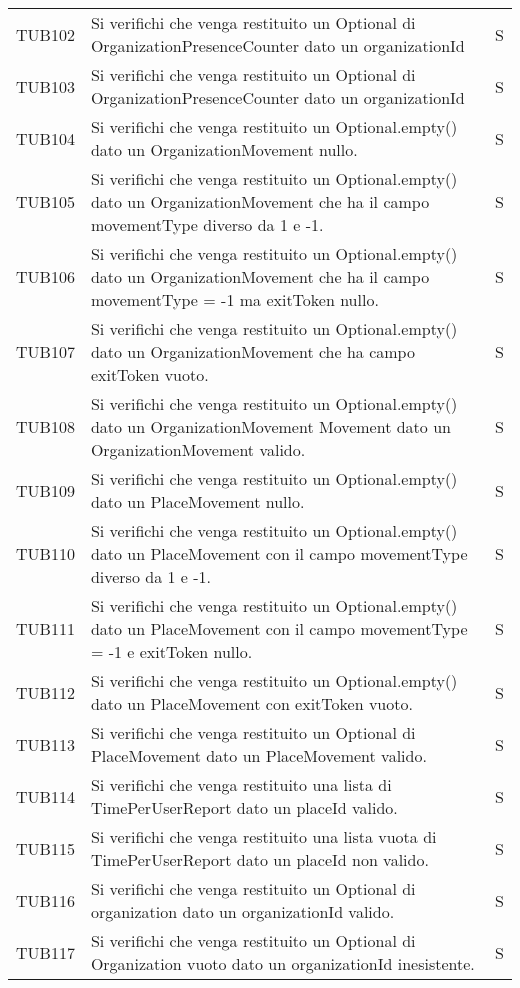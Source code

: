 {\begin{longtable}{ c C{13cm} C{1cm}}
TUB102 & Si verifichi che venga restituito un Optional di OrganizationPresenceCounter dato un organizationId & S \\
TUB103 & Si verifichi che venga restituito un Optional di OrganizationPresenceCounter dato un organizationId & S \\
TUB104 & Si verifichi che venga restituito un Optional.empty()  dato un OrganizationMovement nullo. & S \\
TUB105 & Si verifichi che venga restituito un Optional.empty() dato un OrganizationMovement che ha il campo movementType diverso da 1 e -1. & S \\
TUB106 & Si verifichi che venga restituito un Optional.empty() dato un OrganizationMovement che ha il campo movementType = -1 ma exitToken nullo. & S \\
TUB107 & Si verifichi che venga restituito un Optional.empty() dato un OrganizationMovement che ha campo exitToken vuoto. & S \\
TUB108 & Si verifichi che venga restituito un Optional.empty() dato un OrganizationMovement Movement  dato un OrganizationMovement valido. & S \\
TUB109 & Si verifichi che venga restituito un Optional.empty() dato un PlaceMovement nullo. & S \\
TUB110 & Si verifichi che venga restituito un Optional.empty() dato un PlaceMovement con il campo movementType diverso da 1 e -1. & S \\
TUB111 & Si verifichi che venga restituito un Optional.empty() dato un PlaceMovement con il campo movementType = -1 e exitToken nullo. & S \\
TUB112 & Si verifichi che venga restituito un Optional.empty() dato un PlaceMovement con exitToken vuoto. & S \\
TUB113 & Si verifichi che venga restituito un Optional di PlaceMovement dato un PlaceMovement valido. & S \\
TUB114 & Si verifichi che venga restituito una lista di TimePerUserReport dato un placeId valido. & S \\
TUB115 & Si verifichi che venga restituito una lista vuota di TimePerUserReport dato un placeId non valido. & S \\
TUB116 & Si verifichi che venga restituito un Optional di organization dato un organizationId valido. & S \\
TUB117 & Si verifichi che venga restituito un Optional di Organization vuoto dato un organizationId inesistente. & S \\

\end{longtable}}
